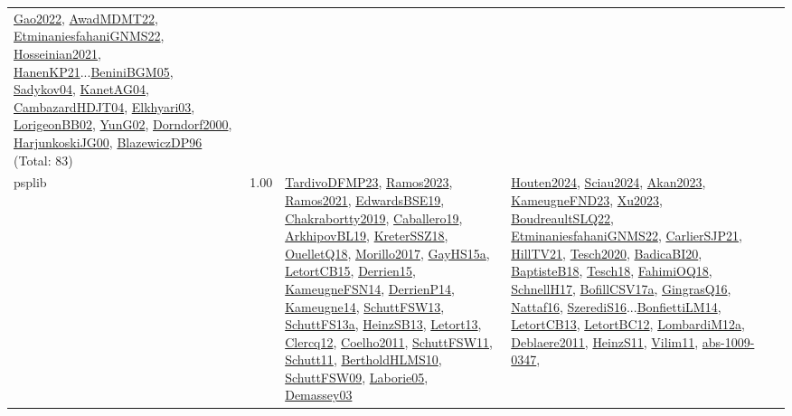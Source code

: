 {\begin{longtable}{p{3cm}r>{\raggedright\arraybackslash}p{6cm}>{\raggedright\arraybackslash}p{6cm}>{\raggedright\arraybackslash}p{8cm}}
\hyperref[detail:Gao2022]{Gao2022}, \hyperref[detail:AwadMDMT22]{AwadMDMT22}, \hyperref[detail:EtminaniesfahaniGNMS22]{EtminaniesfahaniGNMS22}, \hyperref[detail:Hosseinian2021]{Hosseinian2021}, \hyperref[detail:HanenKP21]{HanenKP21}...\hyperref[detail:BeniniBGM05]{BeniniBGM05}, \hyperref[detail:Sadykov04]{Sadykov04}, \hyperref[detail:KanetAG04]{KanetAG04}, \hyperref[detail:CambazardHDJT04]{CambazardHDJT04}, \hyperref[detail:Elkhyari03]{Elkhyari03}, \hyperref[detail:LorigeonBB02]{LorigeonBB02}, \hyperref[detail:YunG02]{YunG02}, \hyperref[detail:Dorndorf2000]{Dorndorf2000}, \hyperref[detail:HarjunkoskiJG00]{HarjunkoskiJG00}, \hyperref[detail:BlazewiczDP96]{BlazewiczDP96} (Total: 83)\\
\index{psplib}\index{Classification!psplib}psplib &  1.00 & \hyperref[detail:TardivoDFMP23]{TardivoDFMP23}, \hyperref[detail:Ramos2023]{Ramos2023}, \hyperref[detail:Ramos2021]{Ramos2021}, \hyperref[detail:EdwardsBSE19]{EdwardsBSE19}, \hyperref[detail:Chakrabortty2019]{Chakrabortty2019}, \hyperref[detail:Caballero19]{Caballero19}, \hyperref[detail:ArkhipovBL19]{ArkhipovBL19}, \hyperref[detail:KreterSSZ18]{KreterSSZ18}, \hyperref[detail:OuelletQ18]{OuelletQ18}, \hyperref[detail:Morillo2017]{Morillo2017}, \hyperref[detail:GayHS15a]{GayHS15a}, \hyperref[detail:LetortCB15]{LetortCB15}, \hyperref[detail:Derrien15]{Derrien15}, \hyperref[detail:KameugneFSN14]{KameugneFSN14}, \hyperref[detail:DerrienP14]{DerrienP14}, \hyperref[detail:Kameugne14]{Kameugne14}, \hyperref[detail:SchuttFSW13]{SchuttFSW13}, \hyperref[detail:SchuttFS13a]{SchuttFS13a}, \hyperref[detail:HeinzSB13]{HeinzSB13}, \hyperref[detail:Letort13]{Letort13}, \hyperref[detail:Clercq12]{Clercq12}, \hyperref[detail:Coelho2011]{Coelho2011}, \hyperref[detail:SchuttFSW11]{SchuttFSW11}, \hyperref[detail:Schutt11]{Schutt11}, \hyperref[detail:BertholdHLMS10]{BertholdHLMS10}, \hyperref[detail:SchuttFSW09]{SchuttFSW09}, \hyperref[detail:Laborie05]{Laborie05}, \hyperref[detail:Demassey03]{Demassey03} & \hyperref[detail:Houten2024]{Houten2024}, \hyperref[detail:Sciau2024]{Sciau2024}, \hyperref[detail:Akan2023]{Akan2023}, \hyperref[detail:KameugneFND23]{KameugneFND23}, \hyperref[detail:Xu2023]{Xu2023}, \hyperref[detail:BoudreaultSLQ22]{BoudreaultSLQ22}, \hyperref[detail:EtminaniesfahaniGNMS22]{EtminaniesfahaniGNMS22}, \hyperref[detail:CarlierSJP21]{CarlierSJP21}, \hyperref[detail:HillTV21]{HillTV21}, \hyperref[detail:Tesch2020]{Tesch2020}, \hyperref[detail:BadicaBI20]{BadicaBI20}, \hyperref[detail:BaptisteB18]{BaptisteB18}, \hyperref[detail:Tesch18]{Tesch18}, \hyperref[detail:FahimiOQ18]{FahimiOQ18}, \hyperref[detail:SchnellH17]{SchnellH17}, \hyperref[detail:BofillCSV17a]{BofillCSV17a}, \hyperref[detail:GingrasQ16]{GingrasQ16}, \hyperref[detail:Nattaf16]{Nattaf16}, \hyperref[detail:SzerediS16]{SzerediS16}...\hyperref[detail:BonfiettiLM14]{BonfiettiLM14}, \hyperref[detail:LetortCB13]{LetortCB13}, \hyperref[detail:LetortBC12]{LetortBC12}, \hyperref[detail:LombardiM12a]{LombardiM12a}, \hyperref[detail:Deblaere2011]{Deblaere2011}, \hyperref[detail:HeinzS11]{HeinzS11}, \hyperref[detail:Vilim11]{Vilim11}, \hyperref[detail:abs-1009-0347]{abs-1009-0347}, 
\end{longtable}}
